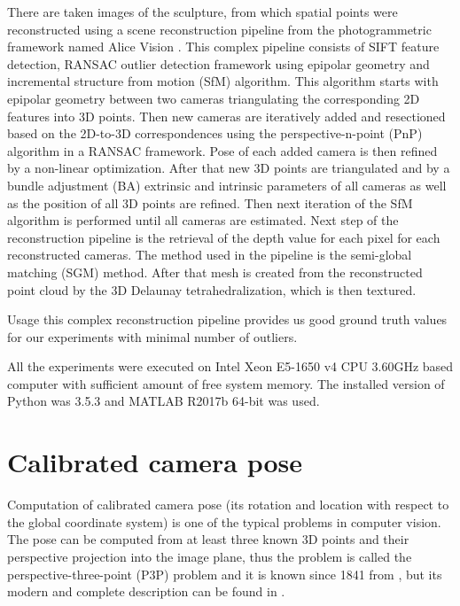 There are \importAppLADIONumCameras{} taken images of the sculpture, from which \importAppLADIONumPoints{} spatial points were reconstructed using a scene reconstruction pipeline from the photogrammetric framework named Alice Vision \cite{ALiceVision}.
This complex pipeline consists of SIFT \cite{sift} feature detection, RANSAC \cite{ransac} outlier detection framework using epipolar geometry and incremental structure from motion (SfM) algorithm.
This algorithm starts with epipolar geometry between two cameras triangulating the corresponding 2D features into 3D points.
Then new cameras are iteratively added and resectioned based on the 2D-to-3D correspondences using the perspective-n-point (PnP) \cite{pnp} algorithm in a RANSAC \cite{ransac} framework.
Pose of each added camera is then refined by a non-linear optimization.
After that new 3D points are triangulated and by a bundle adjustment (BA) extrinsic and intrinsic parameters of all cameras as well as the position of all 3D points are refined.
Then next iteration of the SfM algorithm is performed until all cameras are estimated.
Next step of the reconstruction pipeline is the retrieval of the depth value for each pixel for each reconstructed cameras.
The method used in the pipeline is the semi-global matching (SGM) \cite{sgm} method.
After that mesh is created from the reconstructed point cloud by the 3D Delaunay tetrahedralization, which is then textured.

Usage this complex reconstruction pipeline provides us good ground truth values for our experiments with minimal number of outliers.

All the experiments were executed on Intel Xeon E5-1650 v4 CPU 3.60GHz based computer with sufficient amount of free system memory.
The installed version of Python was 3.5.3 and MATLAB R2017b 64-bit was used.

\section{Calibrated camera pose}
Computation of calibrated camera pose (its rotation and location with respect to the global coordinate system) is one of the typical problems in computer vision.
The pose can be computed from at least three known 3D points and their perspective projection into the image plane, thus the problem is called the perspective-three-point (P3P) problem and it is known since 1841 from \cite{p3p1841}, but its modern and complete description can be found in \cite{P3P}.

